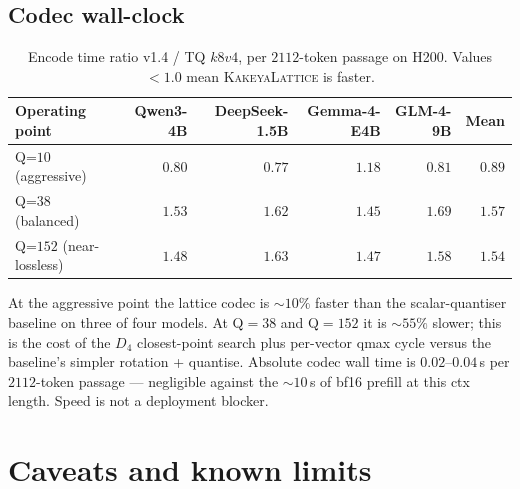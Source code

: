 \documentclass[11pt,a4paper]{article}
\theoremstyle{definition}
\theoremstyle{plain}
\begin{document}
\subsection{Codec wall-clock}

\begin{table}[H]
\centering
\small
\caption{Encode time ratio v1.4 / TQ $k8v4$, per $2112$-token passage
on H200. Values $<1.0$ mean \textsc{KakeyaLattice} is faster.}
\label{tab:speed}
\begin{tabular}{lrrrr|r}
  \toprule
  Operating point & Qwen3-4B & DeepSeek-1.5B & Gemma-4-E4B & GLM-4-9B & Mean \\
  \midrule
  Q=$10$   (aggressive)    & $0.80$ & $0.77$ & $1.18$ & $0.81$ & $\mathbf{0.89}$ \\
  Q=$38$   (balanced)      & $1.53$ & $1.62$ & $1.45$ & $1.69$ & $1.57$ \\
  Q=$152$  (near-lossless) & $1.48$ & $1.63$ & $1.47$ & $1.58$ & $1.54$ \\
  \bottomrule
\end{tabular}
\end{table}

At the aggressive point the lattice codec is $\sim\!10\%$ faster
than the scalar-quantiser baseline on three of four models. At
Q$=38$ and Q$=152$ it is $\sim\!55\%$ slower; this is the cost of
the $D_4$ closest-point search plus per-vector qmax cycle versus the
baseline's simpler rotation + quantise. Absolute codec wall time is
$0.02$--$0.04\,$s per $2112$-token passage --- negligible against the
$\sim\!10\,$s of bf16 prefill at this ctx length.  Speed is not a
deployment blocker.

\section{Caveats and known limits}
\label{sec:limits}
\end{document}
